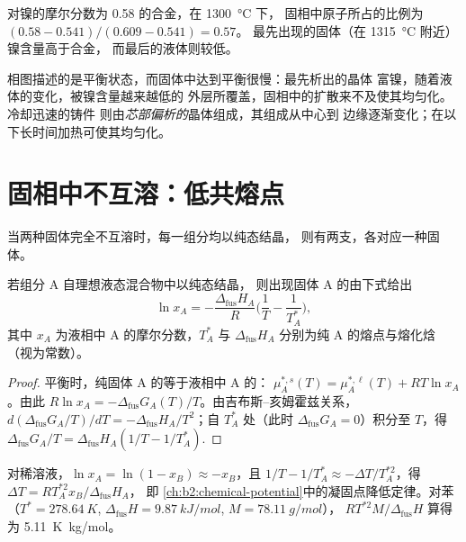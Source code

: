 \begin{example}\label{ex:b2:solid-liquid-diagrams:lever}
对镍的摩尔分数为 0.58 的合金，在 \qty{1300}{\degreeCelsius} 下，
固相中原子所占的比例为 $(0.58 - 0.541)/(0.609 - 0.541) = 0.57$。
最先出现的固体（在 \qty{1315}{\degreeCelsius} 附近）镍含量高于合金，
而最后的液体则较低。
\end{example}

相图描述的是平衡状态，而固体中达到平衡很慢：最先析出的晶体
富镍，随着液体的变化，被镍含量越来越低的
外层所覆盖，固相中的扩散来不及使其均匀化。冷却迅速的铸件
则由\textit{芯部偏析的}晶体组成，其组成从中心到
边缘逐渐变化；在以下长时间加热可使其均匀化。

\section{固相中不互溶：低共熔点}

当两种固体完全不互溶时，每一组分均以纯态结晶，
则有两支，各对应一种固体。

\begin{theorem}\label{thm:b2:solid-liquid-diagrams:schroder}
若组分 A 自理想液态混合物中以纯态结晶，
则出现固体 A 的由下式给出
\[
  \ln x_A = -\frac{\Delta_{\text{fus}}H_A}{R}\Big(\frac1T - \frac1{T_A^*}\Big),
\]
其中 $x_A$ 为液相中 A 的摩尔分数，$T_A^*$ 与
$\Delta_{\text{fus}}H_A$ 分别为纯 A 的熔点与熔化焓
（视为常数）。
\end{theorem}

\begin{proof}
平衡时，纯固体 A 的等于液相中 A 的：
$\mu_A^{*,s}(T) = \mu_A^{*,\ell}(T) + RT\ln x_A$。由此 $R\ln x_A =
-\Delta_{\text{fus}}G_A(T)/T$。由吉布斯--亥姆霍兹关系，$d(\Delta_{\text{fus}}G_A/T)/
dT = -\Delta_{\text{fus}}H_A/T^2$；自 $T_A^*$
处（此时 $\Delta_{\text{fus}}G_A = 0$）积分至 $T$，得 $\Delta_{\text{fus}}G_A/T =
\Delta_{\text{fus}}H_A(1/T - 1/T_A^*)$.
\end{proof}

对稀溶液，$\ln x_A = \ln(1 - x_B) \approx -x_B$，且 $1/T -
1/T_A^* \approx -\Delta T/T_A^{*2}$，得 $\Delta T = RT_A^{*2}x_B/\Delta_{\text{fus}}H_A$，
即 \cref{ch:b2:chemical-potential}中的凝固点降低定律。对苯（$T^* =
\qty{278.64}{K}$, $\Delta_{\text{fus}}H = \qty{9.87}{kJ/mol}$, $M =
\qty{78.11}{g/mol}$）， $RT^{*2}M/\Delta_{\text{fus}}H$
算得为 \qty{5.11}{K.kg/mol}。

